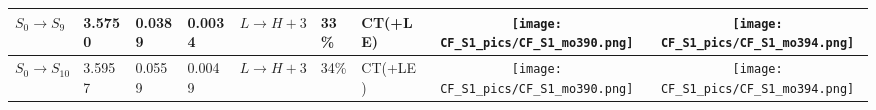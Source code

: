 \documentclass[9pt]{scrartcl}
\begin{document}
\begin{tabular}{l|lll|lllcc}
$S_0 \rightarrow S_{9} $       & 3.5750     & 0.0389     & 0.0034     & $L \rightarrow H+3$            & 33\%       & CT(+LE)    & \texttt{[image: CF\_S1\_pics/CF\_S1\_mo390.png]} & \texttt{[image: CF\_S1\_pics/CF\_S1\_mo394.png]}\\\hline
$S_0 \rightarrow S_{10} $      & 3.5957     & 0.0559     & 0.0049     & $L \rightarrow H+3$            & 34\%       & CT(+LE)    & \texttt{[image: CF\_S1\_pics/CF\_S1\_mo390.png]} & \texttt{[image: CF\_S1\_pics/CF\_S1\_mo394.png]}\\\hline
\end{tabular}
\end{document}
